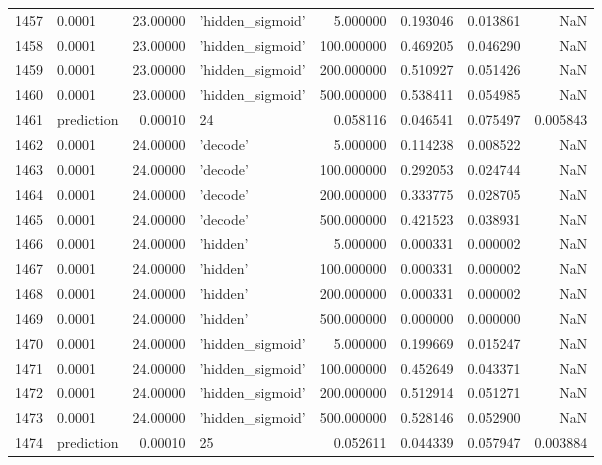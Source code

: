 \documentclass[10pt,a4paper]{article}
\begin{document}
\begin{tabular}{llrlrrrr}
1457 &      0.0001 &  23.00000 &   'hidden\_sigmoid' &    5.000000 &  0.193046 &  0.013861 &       NaN \\
1458 &      0.0001 &  23.00000 &   'hidden\_sigmoid' &  100.000000 &  0.469205 &  0.046290 &       NaN \\
1459 &      0.0001 &  23.00000 &   'hidden\_sigmoid' &  200.000000 &  0.510927 &  0.051426 &       NaN \\
1460 &      0.0001 &  23.00000 &   'hidden\_sigmoid' &  500.000000 &  0.538411 &  0.054985 &       NaN \\
1461 &  prediction &   0.00010 &                 24 &    0.058116 &  0.046541 &  0.075497 &  0.005843 \\
1462 &      0.0001 &  24.00000 &           'decode' &    5.000000 &  0.114238 &  0.008522 &       NaN \\
1463 &      0.0001 &  24.00000 &           'decode' &  100.000000 &  0.292053 &  0.024744 &       NaN \\
1464 &      0.0001 &  24.00000 &           'decode' &  200.000000 &  0.333775 &  0.028705 &       NaN \\
1465 &      0.0001 &  24.00000 &           'decode' &  500.000000 &  0.421523 &  0.038931 &       NaN \\
1466 &      0.0001 &  24.00000 &           'hidden' &    5.000000 &  0.000331 &  0.000002 &       NaN \\
1467 &      0.0001 &  24.00000 &           'hidden' &  100.000000 &  0.000331 &  0.000002 &       NaN \\
1468 &      0.0001 &  24.00000 &           'hidden' &  200.000000 &  0.000331 &  0.000002 &       NaN \\
1469 &      0.0001 &  24.00000 &           'hidden' &  500.000000 &  0.000000 &  0.000000 &       NaN \\
1470 &      0.0001 &  24.00000 &   'hidden\_sigmoid' &    5.000000 &  0.199669 &  0.015247 &       NaN \\
1471 &      0.0001 &  24.00000 &   'hidden\_sigmoid' &  100.000000 &  0.452649 &  0.043371 &       NaN \\
1472 &      0.0001 &  24.00000 &   'hidden\_sigmoid' &  200.000000 &  0.512914 &  0.051271 &       NaN \\
1473 &      0.0001 &  24.00000 &   'hidden\_sigmoid' &  500.000000 &  0.528146 &  0.052900 &       NaN \\
1474 &  prediction &   0.00010 &                 25 &    0.052611 &  0.044339 &  0.057947 &  0.003884 \\

\end{tabular}
\end{document}
